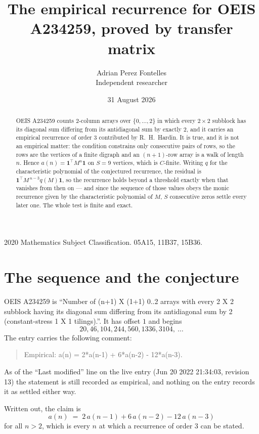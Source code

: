 \documentclass[11pt,a4paper]{article}
\title{The empirical recurrence for OEIS A234259, proved by transfer matrix}
\author{Adrian Perez Fontelles\\ \small Independent researcher}
\date{31 August 2026}
\theoremstyle{plain}
\theoremstyle{definition}
\begin{document}
\maketitle

\begin{abstract}
OEIS A234259 counts $2$-column arrays over $\{0,\dots,2\}$ in which every
$2\times2$ subblock has its diagonal sum differing from its antidiagonal sum by
exactly $2$, and it
carries an empirical recurrence of order $3$ contributed by R.~H.~Hardin. It is true,
and it is not an empirical matter: the condition constrains only consecutive pairs of rows,
so the rows are the vertices of a finite digraph and an $(n+1)$-row array is a walk of
length $n$. Hence $a(n)=\mathbf{1}^{\!\top}M^{n}\mathbf{1}$ on $S=9$ vertices, which
is $C$-finite. Writing $q$ for the characteristic polynomial of the conjectured recurrence,
the residual is $\mathbf{1}^{\!\top}M^{\,n-3}q(M)\mathbf{1}$, so the recurrence
holds beyond a threshold exactly when that vanishes from then on --- and since the sequence
of those values obeys the monic recurrence given by the characteristic polynomial of $M$,
$S$ consecutive zeros settle every later one. The whole test is finite and exact.
\end{abstract}

\noindent\small 2020 Mathematics Subject Classification. 05A15, 11B37, 15B36.\normalsize

\section{The sequence and the conjecture}

OEIS A234259 is ``Number of (n+1) X (1+1) 0..2 arrays with every 2 X 2 subblock having its diagonal sum differing from its antidiagonal sum by 2 (constant-stress 1 X 1 tilings).''. It has offset
$1$ and begins
\[
20, 46, 104, 244, 560, 1336, 3104,\ \dots
\]
The entry carries the following comment:
\begin{quote}\small
Empirical: a(n) = 2*a(n-1) + 6*a(n-2) - 12*a(n-3).
\end{quote}
As of the ``Last modified'' line on the live entry (Jun 20 2022 21:34:03, revision 13) the statement is
still recorded as empirical, and nothing on the entry records it as settled either way.

Written out, the claim is
\begin{equation}\label{eq:conj}
a(n)\;=\;2\,a(n-1) + 6\,a(n-2) - 12\,a(n-3)
\end{equation}
for all $n>2$, which is every $n$ at which a recurrence of order $3$ can be
stated.
\end{document}
